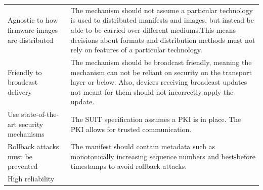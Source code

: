 \documentclass[0-thesis.tex]{subfiles}
\begin{document}
\begin{small}
\begin{longtable}[]{@{}ll@{}}
        \begin{minipage}[t]{0.41\columnwidth}\raggedright\strut
        Agnostic to how firmware images are distributed\strut
        \end{minipage} & \begin{minipage}[t]{0.53\columnwidth}\raggedright\strut
        The mechanism should not assume a particular technology is used to
        distributed manifests and images, but instead be able to be carried over
        different mediums.This means decisions about formats and distribution
        methods must not rely on features of a particular technology.\strut
        \end{minipage}\tabularnewline
        \begin{minipage}[t]{0.41\columnwidth}\raggedright\strut
        Friendly to broadcast delivery\strut
        \end{minipage} & \begin{minipage}[t]{0.53\columnwidth}\raggedright\strut
        The mechanism should be broadcast friendly, meaning the mechanism can
        not be reliant on security on the transport layer or below. Also,
        devices receiving broadcast updates not meant for them should not
        incorrectly apply the update.\strut
        \end{minipage}\tabularnewline
        \begin{minipage}[t]{0.41\columnwidth}\raggedright\strut
        Use state-of-the-art security mechanisms\strut
        \end{minipage} & \begin{minipage}[t]{0.53\columnwidth}\raggedright\strut
        The SUIT specification assumes a PKI is in place. The PKI allows for
        trusted communication.\strut
        \end{minipage}\tabularnewline
        \begin{minipage}[t]{0.41\columnwidth}\raggedright\strut
        Rollback attacks must be prevented\strut
        \end{minipage} & \begin{minipage}[t]{0.53\columnwidth}\raggedright\strut
        The manifest should contain metadata such as monotonically increasing
        sequence numbers and best-before timestamps to avoid rollback
        attacks.\strut
        \end{minipage}\tabularnewline
        \begin{minipage}[t]{0.41\columnwidth}\raggedright\strut
        High reliability\strut
        \end{minipage} & \begin{minipage}[t]{0.53\columnwidth}\raggedright\strut

\end{minipage}
\end{longtable}
\end{small}
\end{document}
